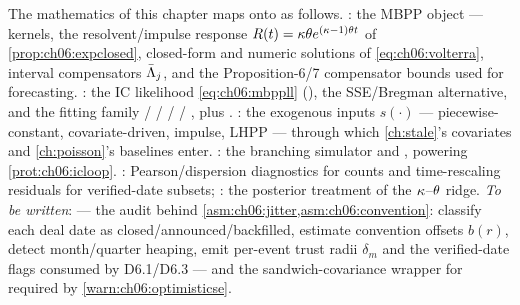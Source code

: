 \begin{codehooks}
The mathematics of this chapter maps onto  as follows.
\emph{}: the MBPP object --- kernels, the resolvent/impulse
response $R(t)=\kappa\theta e^{(\kappa-1)\theta t}$ of
\cref{prop:ch06:expclosed}, closed-form and numeric solutions of
\cref{eq:ch06:volterra}, interval compensators $\bar{\Lambda}_j$, and the
Proposition-6/7 compensator bounds used for forecasting.
\emph{}: the IC likelihood
\cref{eq:ch06:mbppll} (), the SSE/Bregman alternative, and
the fitting family  /
 /  /  /
, plus .
\emph{}: the exogenous inputs $s(\cdot)$ ---
piecewise-constant, covariate-driven, impulse, LHPP --- through which
\cref{ch:stale}'s covariates and \cref{ch:poisson}'s baselines enter.
\emph{}: the branching simulator and
, powering \cref{prot:ch06:icloop}.
\emph{}: Pearson/dispersion diagnostics for counts and
time-rescaling residuals for verified-date subsets;
\emph{}: the posterior treatment of the
$\kappa$--$\theta$ ridge. \emph{To be written}:
 --- the audit behind
\cref{asm:ch06:jitter,asm:ch06:convention}: classify each deal date as
closed/announced/backfilled, estimate convention offsets $b(r)$, detect
month/quarter heaping, emit per-event trust radii $\delta_m$ and the
verified-date flags consumed by D6.1/D6.3 --- and the sandwich-covariance
wrapper for  required by
\cref{warn:ch06:optimisticse}.
\end{codehooks}
